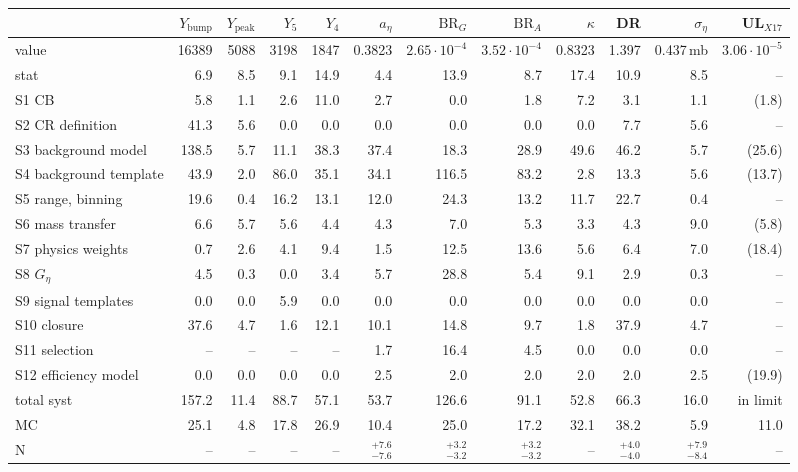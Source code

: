 \begin{tabular}{lrrrrrrrrrrr}
\toprule
 & $Y_\mathrm{bump}$ & $Y_\mathrm{peak}$ & $Y_5$ & $Y_4$ & $a_\eta$ & $\mathrm{BR}_G$ & $\mathrm{BR}_A$ & $\kappa$ & DR & $\sigma_\eta$ & UL$_{X17}$ \\
\midrule
value & 16389 & 5088 & 3198 & 1847 & 0.3823 & $2.65\cdot10^{-4}$ & $3.52\cdot10^{-4}$ & 0.8323 & 1.397 & 0.437\,mb & $3.06\cdot10^{-5}$ \\
stat & 6.9 & 8.5 & 9.1 & 14.9 & 4.4 & 13.9 & 8.7 & 17.4 & 10.9 & 8.5 & -- \\
\midrule
S1 CB & 5.8 & 1.1 & 2.6 & 11.0 & 2.7 & 0.0 & 1.8 & 7.2 & 3.1 & 1.1 & (1.8) \\
S2 CR definition & 41.3 & 5.6 & 0.0 & 0.0 & 0.0 & 0.0 & 0.0 & 0.0 & 7.7 & 5.6 & -- \\
S3 background model & 138.5 & 5.7 & 11.1 & 38.3 & 37.4 & 18.3 & 28.9 & 49.6 & 46.2 & 5.7 & (25.6) \\
S4 background template & 43.9 & 2.0 & 86.0 & 35.1 & 34.1 & 116.5 & 83.2 & 2.8 & 13.3 & 5.6 & (13.7) \\
S5 range, binning & 19.6 & 0.4 & 16.2 & 13.1 & 12.0 & 24.3 & 13.2 & 11.7 & 22.7 & 0.4 & -- \\
S6 mass transfer & 6.6 & 5.7 & 5.6 & 4.4 & 4.3 & 7.0 & 5.3 & 3.3 & 4.3 & 9.0 & (5.8) \\
S7 physics weights & 0.7 & 2.6 & 4.1 & 9.4 & 1.5 & 12.5 & 13.6 & 5.6 & 6.4 & 7.0 & (18.4) \\
S8 $G_\eta$ & 4.5 & 0.3 & 0.0 & 3.4 & 5.7 & 28.8 & 5.4 & 9.1 & 2.9 & 0.3 & -- \\
S9 signal templates & 0.0 & 0.0 & 5.9 & 0.0 & 0.0 & 0.0 & 0.0 & 0.0 & 0.0 & 0.0 & -- \\
S10 closure & 37.6 & 4.7 & 1.6 & 12.1 & 10.1 & 14.8 & 9.7 & 1.8 & 37.9 & 4.7 & -- \\
S11 selection & -- & -- & -- & -- & 1.7 & 16.4 & 4.5 & 0.0 & 0.0 & 0.0 & -- \\
S12 efficiency model & 0.0 & 0.0 & 0.0 & 0.0 & 2.5 & 2.0 & 2.0 & 2.0 & 2.0 & 2.5 & (19.9) \\
\midrule
total syst & 157.2 & 11.4 & 88.7 & 57.1 & 53.7 & 126.6 & 91.1 & 52.8 & 66.3 & 16.0 & in limit \\
MC & 25.1 & 4.8 & 17.8 & 26.9 & 10.4 & 25.0 & 17.2 & 32.1 & 38.2 & 5.9 & 11.0 \\
N & -- & -- & -- & -- & $^{+7.6}_{-7.6}$ & $^{+3.2}_{-3.2}$ & $^{+3.2}_{-3.2}$ & -- & $^{+4.0}_{-4.0}$ & $^{+7.9}_{-8.4}$ & -- \\
\bottomrule
\end{tabular}
